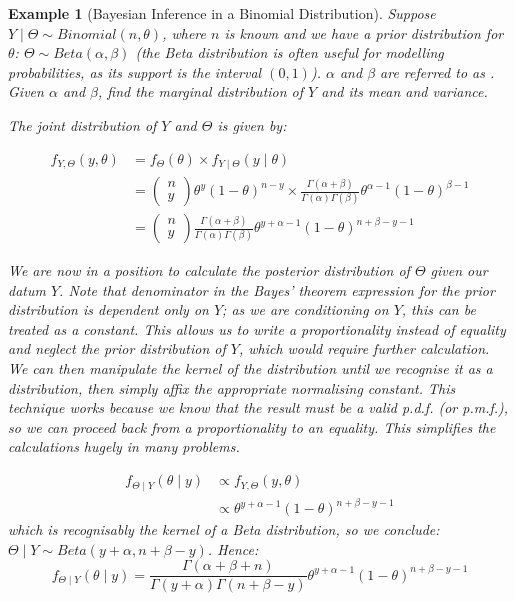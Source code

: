 \documentclass[12pt,a4paper]{article}
\newtheorem{ex}[thm]{Example}
\newcommand{\uline}[1]{\underline{\smash{#1}}}
\begin{document}
\begin{ex}[Bayesian Inference in a Binomial Distribution]\vspace{1cm}

Suppose $Y\mid\Theta \sim Binomial(n,\theta)$, where $n$ is known and we have a prior distribution for $\theta$: $\Theta \sim Beta(\alpha,\beta)$ (the Beta distribution is often useful for modelling probabilities, as its support is the interval $(0,1)$). $\alpha$ and $\beta$ are referred to as \uline{hyperparameters}. Given $\alpha$ and $\beta$, find the marginal distribution of $Y$ and its mean and variance.

The joint distribution of $Y$ and $\Theta$ is given by:

\begin{align*}
f_{Y,\Theta}(y,\theta) &= f_\Theta(\theta) \times f_{Y\mid\Theta}(y\mid\theta)\\
&= \left(\begin{array}{c} \!\!n\!\! \\ \!\!y\!\!\end{array}\right)\theta^y (1-\theta)^{n-y} \times \frac{\Gamma(\alpha + \beta)}{\Gamma(\alpha)\Gamma(\beta)}\theta^{\alpha-1} (1-\theta)^{\beta -1}\\
&= \left(\begin{array}{c}\!\!n\!\! \\ \!\!y\!\!\end{array}\right) \frac{\Gamma(\alpha + \beta)}{\Gamma(\alpha)\Gamma(\beta)} \theta^{y+\alpha-1} (1-\theta)^{n+\beta - y -1}
\end{align*}

We are now in a position to calculate the posterior distribution of $\Theta$ given our datum $Y$. Note that denominator in the Bayes' theorem expression for the prior distribution is dependent only on $Y$; as we are conditioning on $Y$, this can be treated as a constant. This allows us to write a proportionality instead of equality and neglect the prior distribution of $Y$, which would require further calculation. We can then manipulate the kernel of the distribution until we recognise it as a distribution, then simply affix the appropriate normalising constant. This technique works because we know that the result must be a valid p.d.f. (or p.m.f.), so we can proceed back from a proportionality to an equality. This simplifies the calculations hugely in many problems.

\begin{align*}
f_{\Theta\mid Y}(\theta\mid y) &\propto f_{Y,\Theta}(y,\theta)\\
&\propto \theta^{y+\alpha-1} (1-\theta)^{n+\beta-y-1}
\end{align*}
which is recognisably the kernel of a Beta distribution, so we conclude: $\Theta\mid Y \sim Beta(y+\alpha,n+\beta-y)$. Hence:
$$f_{\Theta\mid Y}(\theta\mid y) = \frac{\Gamma(\alpha+\beta+n)}{\Gamma(y+\alpha)\Gamma(n+\beta -y)} \theta^{y+\alpha-1} (1-\theta)^{n+\beta-y-1}$$


\end{ex}
\end{document}
